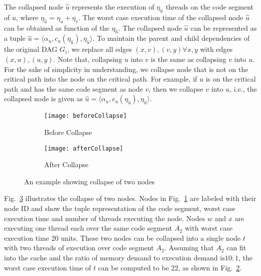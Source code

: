 The collapsed node $\hat{u}$ represents the execution of $\eta_{\hat{u}}$ threads on the code segment of $u$, where $\eta_{\hat{u}} = \eta_u+\eta_v$. The worst case execution time of the collapsed node $\hat{u}$ can be obtained as function of the $\eta_{\hat{u}}$. The collapsed node $\hat{u}$ can be represented as a tuple $\hat{u} = \langle \alpha_u , c_u(\eta_{\hat{u}}), \eta_{\hat{u}} \rangle$. To maintain the parent and child dependencies of the original DAG $G_i$, we replace all edges $(x , v) , (v, y) \forall x, y$ with edges $(x, u), (u, y)$. Note that, collapsing $u$ into $v$ is the same as collapsing $v$ into $u$. For the sake of simplicity in understanding, we collapse node that is not on the critical path into the node on the critical path. For example, if $u$ is on the critical path and has the same code segment as node $v$, then we collapse $v$ into $u$, i.e., the collapsed node is given as $\hat{u} =  \langle \alpha_u , c_u(\eta_{\hat{u}}), \eta_{\hat{u}} \rangle$.


\begin{figure}
  \centering
  \begin{subfigure}[b]{0.4\textwidth}{
      \texttt{[image: beforeCollapse]}
      \caption{Before Collapse}
      \label{fig:before-collapse}
    }
  \end{subfigure} \quad
  \begin{subfigure}[b]{0.4\textwidth}{
      \texttt{[image: afterCollapse]}
      \caption{After Collapse}
      \label{fig:after-collapse}
    }
  \end{subfigure}
  \caption{An example showing collapse of two nodes}
  \label{fig:dag-collapse}
\end{figure}

Fig.~\ref{fig:dag-collapse} illustrates the collapse of two nodes. Nodes in
Fig.~\ref{fig:before-collapse} are labeled with their node ID and show the tuple representation of the code segment, worst case execution time and number of threads executing the node. Nodes $w$ and $x$ are executing one thread each over the same code segment $A_2$ with worst case execution time 20 units. These two nodes can be collapsed into a single node $t$ with two threads of execution over code segment $A_2$. Assuming that $A_2$ can fit into the cache and the ratio of memory demand to execution demand is$10:1$, the worst case execution time of $t$ can be computed to be $22$, as shown in
Fig.~\ref{fig:after-collapse}.

  





